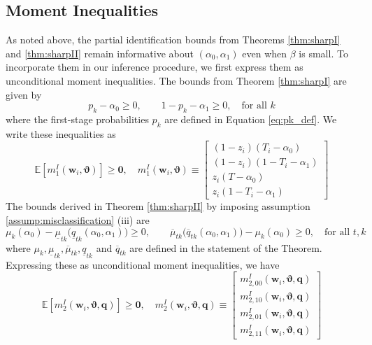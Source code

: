 \subsection{Moment Inequalities} 
\label{sec:inequalities}
As noted above, the partial identification bounds from Theorems \ref{thm:sharpI} and \ref{thm:sharpII} remain informative about $(\alpha_0, \alpha_1)$ even when $\beta$ is small.
To incorporate them in our inference procedure, we first express them as unconditional moment inequalities.
The bounds from Theorem \ref{thm:sharpI} are given by
\begin{equation*}
  p_k - \alpha_0 \geq 0, \quad \quad 1 - p_k - \alpha_1 \geq 0, \quad \mbox{for all } k 
\end{equation*}
where the first-stage probabilities $p_k$ are defined in Equation \ref{eq:pk_def}.
We write these inequalities as 
\begin{equation}
  \mathbb{E}\left[ m_1^I(\mathbf{w}_i,\boldsymbol{\vartheta} ) \right] \geq \mathbf{0},  \quad
m_1^I(\mathbf{w}_i, \boldsymbol{\vartheta}) \equiv \left[
  \begin{array}{l}
    (1 - z_i)(T_i - \alpha_0) \\
    (1 - z_i)(1 - T_i - \alpha_1) \\
    z_i(T - \alpha_0) \\
    z_i (1 - T_i - \alpha_1) 
  \end{array}
\right]
\label{eq:m1I}
\end{equation}
The bounds derived in Theorem \ref{thm:sharpII} by imposing assumption \ref{assump:misclassification} (iii) are
\begin{equation*}
  \mu_k(\alpha_0) - \underline{\mu}_{tk}\big( \underline{q}_{tk}(\alpha_0, \alpha_1) \big) \geq 0, \quad \quad
  \overline{\mu}_{tk}\big( \overline{q}_{tk}(\alpha_0, \alpha_1) \big) - \mu_k(\alpha_0) \geq 0, \quad \mbox{for all } t,k
\end{equation*}
where $\mu_k, \underline{\mu}_{tk}, \overline{\mu}_{tk}, \underline{q}_{tk}$ and $\overline{q}_{tk}$ are defined in the statement of the Theorem.
Expressing these as unconditional moment inequalities, we have
\begin{equation}
  \mathbb{E}[m_2^I(\mathbf{w}_i,\boldsymbol{\vartheta}, \mathbf{q})] \geq \mathbf{0}, \quad 
  m_2^I(\mathbf{w}_i,\boldsymbol{\vartheta}, \mathbf{q}) \equiv \left[
  \begin{array}{c}
    m_{2,00}^I(\mathbf{w}_i,\boldsymbol{\vartheta}, \mathbf{q})  \\ 
    m_{2,10}^I(\mathbf{w}_i,\boldsymbol{\vartheta}, \mathbf{q}) \\
    m_{2,01}^I(\mathbf{w}_i,\boldsymbol{\vartheta}, \mathbf{q})  \\ 
    m_{2,11}^I(\mathbf{w}_i,\boldsymbol{\vartheta}, \mathbf{q}) 
  \end{array}
  \label{eq:m2I}
\right] 
\end{equation}
